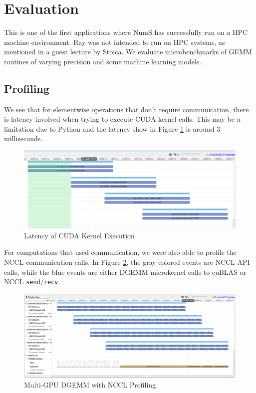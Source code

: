 \documentclass{article}
\begin{document}
\section{Evaluation}
This is one of the first applications where NumS has successfully run on a HPC machine environment. Ray was not intended to run on HPC systems, as mentioned in a guest lecture by Stoica. \cite{ray-lecture} We evaluate microbenchmarks of GEMM routines of varying precision and some machine learning models.

\subsection{Profiling}
We see that for elementwise operations that don't require communication, there is latency involved when trying to execute CUDA kernel calls. This may be a limitation due to Python and the latency show in Figure \ref{fig:stream} is around 3 milliseconds. 

\begin{figure}
  \centerline{\includegraphics[width=6in]{figures/stream.png}}
  \caption{Latency of CUDA Kernel Execution}
  \label{fig:stream}
\end{figure}

For computations that used communication, we were also able to profile the NCCL communication calls. In Figure \ref{fig:nccl-dgemm}, the gray colored events are NCCL API calls, while the blue events are either DGEMM microkernel calls to cuBLAS or NCCL \verb|send|/\verb|recv|.

\begin{figure}
  \centerline{\includegraphics[width=6in]{hw/latex/figures/nccl-dgemm.png}}
  \caption{Multi-GPU DGEMM with NCCL Profiling}
  \label{fig:nccl-dgemm}
\end{figure}
\end{document}
